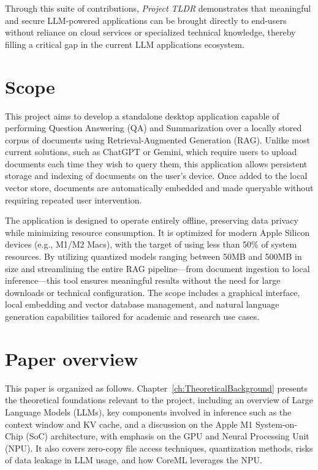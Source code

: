 Through this suite of contributions, \textit{Project TLDR} demonstrates that meaningful and secure LLM-powered applications can be brought directly to end-users without reliance on cloud services or specialized technical knowledge, thereby filling a critical gap in the current LLM applications ecosystem.


\section{Scope}
\label{sec:Scope}

This project aims to develop a standalone desktop application capable of performing Question Answering (QA) and Summarization over a locally stored corpus of documents using Retrieval-Augmented Generation (RAG). Unlike most current solutions, such as ChatGPT or Gemini, which require users to upload documents each time they wish to query them, this application allows persistent storage and indexing of documents on the user's device. Once added to the local vector store, documents are automatically embedded and made queryable without requiring repeated user intervention.

The application is designed to operate entirely offline, preserving data privacy while minimizing resource consumption. It is optimized for modern Apple Silicon devices (e.g., M1/M2 Macs), with the target of using less than 50\% of system resources. By utilizing quantized models ranging between 50MB and 500MB in size and streamlining the entire RAG pipeline—from document ingestion to local inference—this tool ensures meaningful results without the need for large downloads or technical configuration. The scope includes a graphical interface, local embedding and vector database management, and natural language generation capabilities tailored for academic and research use cases.
\section{Paper overview}
\label{sec:PaperOverview}

This paper is organized as follows. Chapter~\ref{ch:TheoreticalBackground} presents the theoretical foundations relevant to the project, including an overview of Large Language Models (LLMs), key components involved in inference such as the context window and KV cache, and a discussion on the Apple M1 System-on-Chip (SoC) architecture, with emphasis on the GPU and Neural Processing Unit (NPU). It also covers zero-copy file access techniques, quantization methods, risks of data leakage in LLM usage, and how CoreML leverages the NPU.

